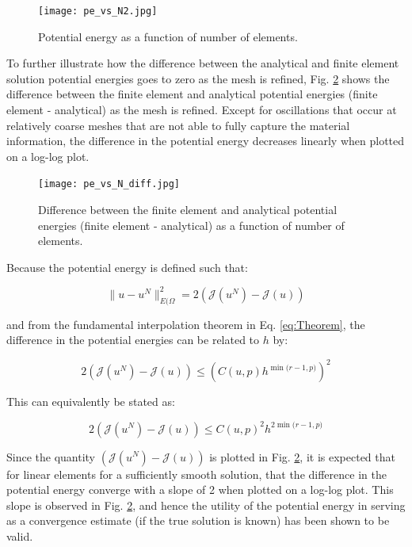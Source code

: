 \documentclass[10pt]{article}
\begin{document}
\begin{figure}[H]
  \centering
  \texttt{[image: pe\_vs\_N2.jpg]} %
  \caption{Potential energy as a function of number of elements. }
  \label{fig:PotentialEnergy2}
\end{figure}

To further illustrate how the difference between the analytical and finite element solution potential energies goes to zero as the mesh is refined, Fig. \ref{fig:PotentialEnergy3} shows the difference between the finite element and analytical potential energies (finite element - analytical) as the mesh is refined. Except for oscillations that occur at relatively coarse meshes that are not able to fully capture the material information, the difference in the potential energy decreases linearly when plotted on a log-log plot. 

\begin{figure}[H]
  \centering
  \texttt{[image: pe\_vs\_N\_diff.jpg]} %
  \caption{Difference between the finite element and analytical potential energies (finite element - analytical) as a function of number of elements.}
  \label{fig:PotentialEnergy3}
\end{figure}

Because the potential energy is defined such that:

\begin{equation}
\|u-u^N\|_{E(\Omega}^2=2\left(\mathscr{J}(u^N)-\mathscr{J}(u)\right)
\end{equation}

and from the fundamental interpolation theorem in Eq. \eqref{eq:Theorem}, the difference in the potential energies can be related to \(h\) by:

\begin{equation}
2\left(\mathscr{J}(u^N)-\mathscr{J}(u)\right)\leq \left(C(u, p)h^{\min{(r-1, p})}\right)^2
\end{equation}

This can equivalently be stated as:

\begin{equation}
2\left(\mathscr{J}(u^N)-\mathscr{J}(u)\right)\leq C(u, p)^2h^{2\min{(r-1, p})}
\end{equation}

Since the quantity \(\left(\mathscr{J}(u^N)-\mathscr{J}(u)\right)\) is plotted in Fig. \ref{fig:PotentialEnergy3}, it is expected that for linear elements for a sufficiently smooth solution, that the difference in the potential energy converge with a slope of 2 when plotted on a log-log plot. This slope is observed in Fig. \ref{fig:PotentialEnergy3}, and hence the utility of the potential energy in serving as a convergence estimate (if the true solution is known) has been shown to be valid.
\end{document}
